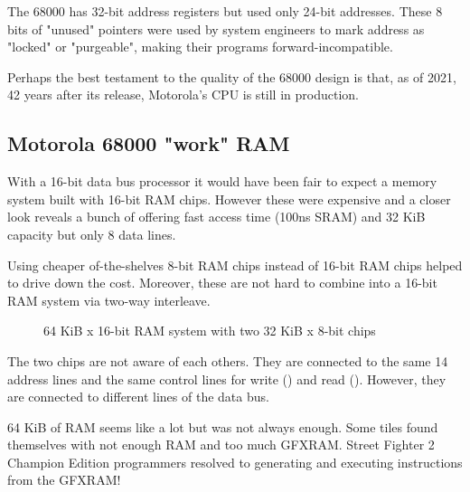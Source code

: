 \begin{trivia}
 The 68000 has 32-bit address registers but used only 24-bit addresses. These 8 bits of "unused" pointers were used by system engineers to mark address as "locked" or "purgeable", making their programs forward-incompatible. 
\end{trivia}

Perhaps the best testament to the quality of the 68000 design is that, as of 2021, 42 years after its release, Motorola's CPU is still in production.


\subsection{Motorola 68000 "work" RAM}
With a 16-bit data bus processor it would have been fair to expect a memory system built with 16-bit RAM chips. However these were expensive and a closer look reveals a bunch of  offering fast access time (100ns SRAM) and 32 KiB capacity but only 8 data lines.

\pagebreak

Using cheaper of-the-shelves 8-bit RAM chips instead of 16-bit RAM chips helped to drive down the cost. Moreover, these are not hard to combine into a 16-bit RAM system via two-way interleave.

\begin{figure}[H]
\caption*{64 KiB x 16-bit RAM system with two 32 KiB x 8-bit chips}
\end{figure}

The two chips are not aware of each others. They are connected to the same 14 address lines and the same control lines for write () and read (). However, they are connected to different lines of the data bus. 


 \begin{trivia}
 64 KiB of RAM seems like a lot but was not always enough. Some tiles found themselves with not enough RAM and too much GFXRAM. Street Fighter 2 Champion Edition programmers resolved to generating and executing instructions from the GFXRAM\cite{mame_cps1_driver}!
 \end{trivia}

